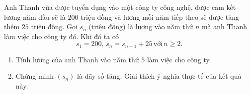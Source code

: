 \begin{bt}%
	Anh Thanh vừa được tuyển dụng vào một công ty công nghệ, được cam kết lương năm đầu sẽ là $200$ triệu đồng và lương mỗi năm tiếp theo sẽ được tăng thêm $25$ triệu đồng. Gọi $s_n$ (triệu đồng) là lương vào năm thứ $n$ mà anh Thanh làm việc cho công ty đó. Khi đó ta có
	$$s_1=200,\, s_n=s_{n-1}+25\, \text{với}\, n \ge 2.$$
	\begin{enumerate}
		\item Tính lương của anh Thanh vào năm thứ $5$ làm việc cho công ty.
		\item Chứng minh $(s_n)$ là dãy số tăng. Giải thích ý nghĩa thực tế của kết quả này. 
	\end{enumerate}
\end{bt}


